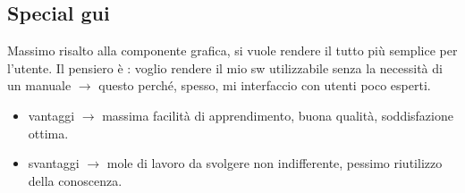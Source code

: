 \documentclass[a4paper,12pt]{report}
\begin{document}
	\subsection{Special gui}
	Massimo risalto alla componente grafica, si vuole rendere il tutto più semplice per l’utente. Il pensiero è : voglio rendere il mio sw utilizzabile senza la necessità di un manuale $\rightarrow$ questo perché, spesso, mi interfaccio con utenti poco esperti. 
	\begin{itemize} 
		\item vantaggi  $\rightarrow$ massima facilità di apprendimento, buona qualità, soddisfazione ottima.
		\item svantaggi $\rightarrow$ mole di lavoro da svolgere non indifferente, pessimo riutilizzo della conoscenza.
	\end{itemize}
	
		
\end{document}
